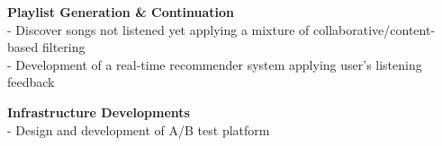 \begin{cventries}
{\begin{cvitems}
{                    {\bf Playlist Generation \& Continuation} \\
                    - Discover songs not listened yet applying a mixture of collaborative/content-based filtering
                         \\
                    - Development of a real-time recommender system applying user's listening feedback
                         \nn
                }
                \item{
                    {\bf Infrastructure Developments} \\
                    - Design and development of A/B test platform
                         \nn
                }
            \end{cvitems}
        }
\end{cventries}